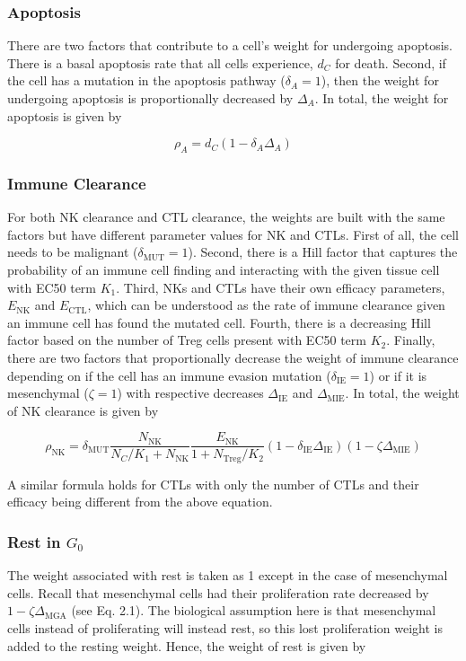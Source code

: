 \documentclass[11pt, a4paper, preprint]{article}
\begin{document}
\subsubsection{Apoptosis}
There are two factors that contribute to a cell's weight for undergoing apoptosis.
There is a basal apoptosis rate that all cells experience, $d_C$ for death.
Second, if the cell has a mutation in the apoptosis pathway ($\delta_A=1$), then the weight for undergoing apoptosis is proportionally decreased by $\Delta_A$.
In total, the weight for apoptosis is given by 

\begin{equation}\tag{2.2}
\rho_A = d_C(1-\delta_{A}\Delta_A)
\end{equation}

\subsubsection{Immune Clearance}
For both NK clearance and CTL clearance, the weights are built with the same factors but have different parameter values for NK and CTLs.
First of all, the cell needs to be malignant ($\delta_{\text{MUT}}=1$).
Second, there is a Hill factor that captures the probability of an immune cell finding and interacting with the given tissue cell with EC50 term $K_1$.
Third, NKs and CTLs have their own efficacy parameters, $E_{\text{NK}}$ and $E_{\text{CTL}}$, which can be understood as the rate of immune clearance given an immune cell has found the mutated cell.
Fourth, there is a decreasing Hill factor based on the number of Treg cells present with EC50 term $K_2$.
Finally, there are two factors that proportionally decrease the weight of immune clearance depending on if the cell has an immune evasion mutation ($\delta_{\text{IE}}=1$) or if it is mesenchymal ($\zeta=1$) with respective decreases $\Delta_{\text{IE}}$ and $\Delta_{\text{MIE}}$.
In total, the weight of NK clearance is given by

\begin{equation}\tag{2.3}
\rho_{\text{NK}} =\delta_{\text{MUT}} \frac{N_{\text{NK}}}{N_C/K_{1}+N_{\text{NK}}}  \frac{E_{\text{NK}}}{1+N_{\text{Treg}}/K_2} (1-\delta_{\text{IE}}\Delta_{\text{IE}})(1-\zeta \Delta_{\text{MIE}})
\end{equation}

A similar formula holds for CTLs with only the number of CTLs and their efficacy being different from the above equation.


\subsubsection{Rest in $G_0$} 
The weight associated with rest is taken as 1 except in the case of mesenchymal cells.
Recall that mesenchymal cells had their proliferation rate decreased by $1-\zeta\Delta_{\text{MGA}}$ (see Eq. 2.1).
The biological assumption here is that mesenchymal cells instead of proliferating will instead rest, so this lost proliferation weight is added to the resting weight.
Hence, the weight of rest is given by
\end{document}
